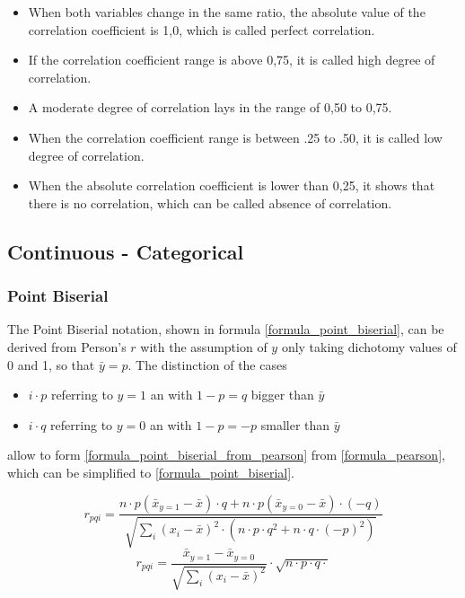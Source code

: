 \documentclass[a4paper,12pt]{report}
\begin{document}
\begin{itemize}
  \item When both variables change in the same ratio, the absolute value of the correlation coefficient is 1,0, which is called perfect correlation.
  \item If the correlation coefficient range is above 0,75, it is called high degree of correlation.
  \item A moderate degree of correlation lays in the range of 0,50 to 0,75.
  \item When the correlation coefficient range is between .25 to .50, it is called low degree of correlation.
  \item When the absolute correlation coefficient is lower than 0,25, it shows that there is no correlation, which can be called absence of correlation.
\end{itemize}	

\subsection{Continuous - Categorical}

\subsubsection{Point Biserial}

The Point Biserial notation, shown in formula \ref{formula_point_biserial}, can be derived from Person's $r$ with the assumption of $y$ only taking dichotomy values of 0 and 1, so that $\bar{y} = p$. The distinction of the cases

\begin{itemize}
	\item $i \cdot p$ referring to $y=1$ an with $1 - p = q$ bigger than $\bar{y}$
	\item $i \cdot q$ referring to $y=0$ an with $1 - p = -p$ smaller than $\bar{y}$
\end{itemize}
allow to form \ref{formula_point_biserial_from_pearson} from \ref{formula_pearson}, which can be simplified to \ref{formula_point_biserial}. \cite{Tate1954,CohenWest2003,Bortz2004,DeJesus2019}

\smallskip

\begin{equation}
\label{formula_point_biserial_from_pearson}
	r_{pqi} =  \frac{n \cdot p (\bar{x}_{y=1}-\bar{x}) \cdot q + n \cdot p (\bar{x}_{y=0}-\bar{x}) \cdot (-q)}{\sqrt{\sum_{i}{(x_i-\bar{x})^2} \cdot (n \cdot p \cdot q^2 + n \cdot q \cdot (-p)^2)}}
\end{equation}
\begin{equation}
\label{formula_point_biserial}
	r_{pqi} =  \frac{\bar{x}_{y=1}-\bar{x}_{y=0}}{\sqrt{\sum_{i}{(x_i-\bar{x})^2}}} \cdot \sqrt{n \cdot p \cdot q \cdot} 
\end{equation}
\end{document}
